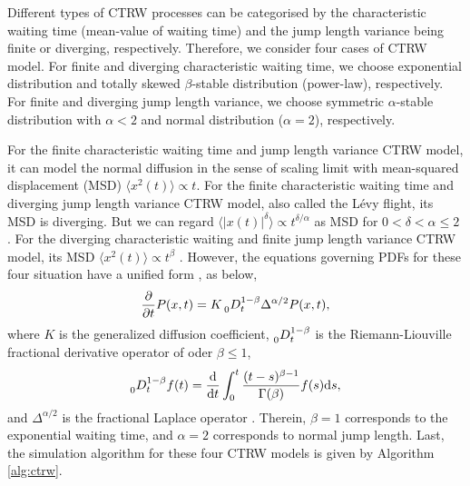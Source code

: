 \documentclass[aps, pre, preprint, amsmath, amssymb]{revtex4}
\renewcommand{\d}{\mathrm{d}}
\begin{document}
Different types of CTRW processes can be categorised by the characteristic waiting time (mean-value of waiting time) and the jump length variance being finite or diverging\cite{metzler2000random}, respectively.
Therefore, we consider four cases of CTRW model. For finite and diverging characteristic waiting time, we choose exponential distribution and totally skewed $\beta$-stable distribution (power-law), respectively. 
For finite and diverging jump length variance, we choose symmetric $\alpha$-stable distribution with $\alpha < 2$ and normal distribution ($\alpha=2$), respectively.

For the finite characteristic waiting time and jump length variance CTRW model, it can model the normal diffusion in the sense of scaling limit with mean-squared displacement (MSD) $\langle x^2(t)\rangle\propto t$. 
For the finite characteristic waiting time and diverging jump length variance CTRW model, also called the L\'{e}vy flight, its MSD is diverging. But we can regard $\langle |x(t)|^{\delta}\rangle\propto t^{\delta/\alpha}$  as MSD for $0<\delta< \alpha \leqslant 2$ \cite{metzler2000random}.
For the diverging characteristic waiting and finite jump length variance CTRW model, its MSD $\langle x^2(t)\rangle\propto t^{\beta}$ \cite{metzler2000random}. 
However, the equations governing PDFs for these four situation have a unified form \cite{mandelbrot1960pareto,deng2020modeling, RN60, RN61, RN64, RN65}, as below,
\begin{equation}
\frac{\partial}{\partial t}P(x,t)=K\prescript{}{0}{D_t^{1-\beta}}\Delta^{\alpha/2}P(x,t),
\end{equation}
where $K$ is the generalized diffusion coefficient, $\prescript{}{0}{D_t^{1-\beta}}$ is the Riemann-Liouville fractional derivative operator \cite{bleanu2019handbook, sabatier2007advances, podlubny1998fractional} of oder $\beta\leqslant 1$, 
\begin{equation}
\prescript{}{0}{D_t^{1-\beta}}f(t)=\frac{\d}{\d t}\int_0^t\frac{(t-s)^{\beta-1}}{\Gamma(\beta)}f(s)\d s,
\end{equation}
and $\Delta^{\alpha/2}$ is the fractional Laplace operator \cite{lischke2020fractional,pozrikidis2018fractional}. 
Therein, $\beta=1$ corresponds to the exponential waiting time, and $\alpha=2$ corresponds to normal jump length.
Last, the simulation algorithm for these four CTRW models is given by Algorithm \ref{alg:ctrw}.
\end{document}
